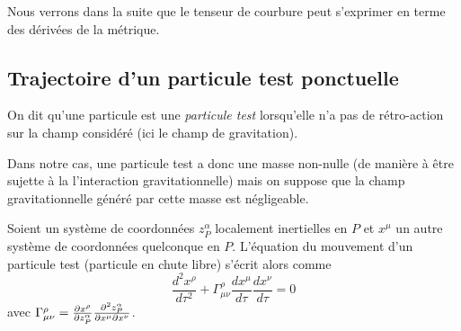 \documentclass[a4paper,11pt]{report}
\begin{document}
            Nous verrons dans la suite que le tenseur de courbure peut s'exprimer en terme des dérivées de la métrique.
    
        \subsection{Trajectoire d'un particule test ponctuelle}
        
            \begin{definition}
                On dit qu'une particule est une \textit{particule test} lorsqu'elle n'a pas de rétro-action sur la champ considéré (ici le champ de gravitation).
            \end{definition}
            
            Dans notre cas, une particule test a donc une masse non-nulle (de manière à être sujette à la l'interaction gravitationnelle) mais on suppose que la champ gravitationnelle généré par cette masse est négligeable.
            
            \begin{prop}\begin{leftbar}
                Soient un système de coordonnées $z^\alpha_P$ localement inertielles en $P$ et $x^\mu$ un autre système de coordonnées quelconque en $P$. L'équation du mouvement d'un particule test (particule en chute libre) s'écrit alors comme
                \begin{equation}
                    \frac{d^2x^\rho}{d\tau^2}+\Gamma^\rho_{\mu\nu}\frac{dx^\mu}{d\tau}\frac{dx^\nu}{d\tau} = 0
                \end{equation}
                avec $\Gamma^\rho_{\mu\nu} = \frac{\partial x^\rho}{\partial z^\alpha_P}\frac{\partial^2 z^\alpha_P}{\partial x^\mu\partial x^\nu}$.
            \end{leftbar}\end{prop}
            
\end{document}
